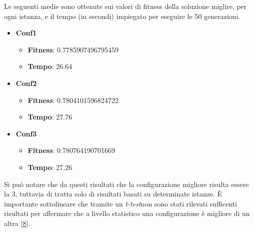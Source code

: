 Le seguenti medie sono ottenute sui valori di fitness della soluzione miglire, per ogni istanza, e il tempo (in secondi) impiegato per eseguire le 50 generazioni.

\begin{itemize}
    \item \textbf{Conf1}
    \begin{itemize}
        \item\textbf{Fitness}: 0.7785907496795459
        \item\textbf{Tempo}: 26.64 
    \end{itemize}
    \item \textbf{Conf2}
    \begin{itemize}
        \item\textbf{Fitness}: 0.7804101596824722
        \item\textbf{Tempo}: 27.76
    \end{itemize}
    \item \textbf{Conf3}
    \begin{itemize}
        \item\textbf{Fitness}: 0.780764190701669
        \item\textbf{Tempo}: 27.26
    \end{itemize}
\end{itemize}

Si può notare che da questi risultati che la configurazione migliore risulta essere la 3, tuttavia di tratta solo di risultati basati su determinate istanze. È importante sottolineare che tramite un \emph{t-test}\glsfirstoccur non sono stati rilevati sufficenti risultati per affermare che a livello statistico una configurazione è migliore di un altra [\hyperlink{bibliografia}{8}]. 





